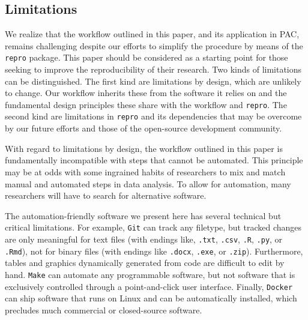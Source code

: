 \documentclass[psych,tutorial,accept,moreauthors,pdftex]{Definitions/mdpi}
\begin{document}
\begin{paracol}{2}
\subsection{Limitations}\label{limitations}

We realize that the workflow outlined in this paper, and its application
in PAC, remains challenging despite our efforts to simplify the
procedure by means of the \texttt{repro} package. This paper should be
considered as a starting point for those seeking to improve the
reproducibility of their research. Two kinds of limitations can be
distinguished. The first kind are limitations by design, which are
unlikely to change. Our workflow inherits these from the software it
relies on and the fundamental design principles these share with the
workflow and \texttt{repro}. The second kind are limitations in
\texttt{repro} and its dependencies that may be overcome by our future
efforts and those of the open-source development community.

With regard to limitations by design, the workflow outlined in this
paper is fundamentally incompatible with steps that cannot be automated.
This principle may be at odds with some ingrained habits of researchers
to mix and match manual and automated steps in data analysis. To allow
for automation, many researchers will have to search for alternative
software.

The automation-friendly software we present here has several technical
but critical limitations. For example, \texttt{Git} can track any
filetype, but tracked changes are only meaningful for text files (with
endings like, \texttt{.txt}, \texttt{.csv}, \texttt{.R}, \texttt{.py},
or \texttt{.Rmd}), not for binary files (with endings like
\texttt{.docx}, \texttt{.exe}, or \texttt{.zip}). Furthermore, tables
and graphics dynamically generated from code are difficult to edit by
hand. \texttt{Make} can automate any programmable software, but not
software that is exclusively controlled through a point-and-click user
interface. Finally, \texttt{Docker} can ship software that runs on Linux
and can be automatically installed, which precludes much commercial or
closed-source software.


\end{paracol}
\end{document}
